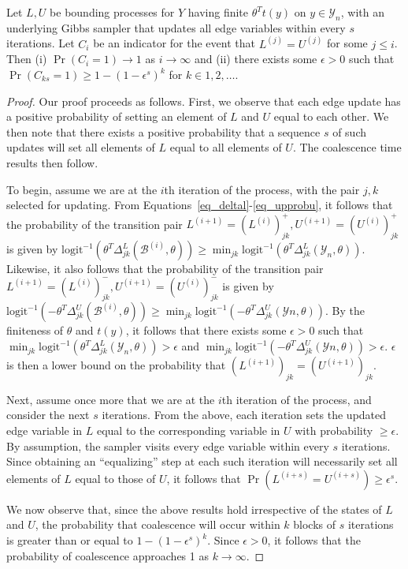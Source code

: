 \documentclass[11pt]{article}
\newcommand{\ilogit}{\ensuremath{\mathrm{logit}^{-1}}\xspace}
\begin{document}
\begin{theorem} \label{thm_coal}
Let $L, U$ be bounding processes for $Y$ having finite $\theta^T t(y)$ on $y\in \mathcal{Y}_n$, with an underlying Gibbs sampler that updates all edge variables within every $s$ iterations.  Let $C_i$ be an indicator for the event that $L^{(j)}=U^{(j)}$ for some $j\le i$.  Then (i) $\Pr(C_i=1)\to 1$ as $i \to \infty$ and (ii) there exists some $\epsilon>0$ such that $\Pr(C_{ks}=1)\ge 1-(1-\epsilon^s)^k$ for $k\in 1,2,\ldots$.
\end{theorem}
\begin{proof}
Our proof proceeds as follows.  First, we observe that each edge update has a positive probability of setting an element of $L$ and $U$ equal to each other.  We then note that there exists a positive probability that a sequence $s$ of such updates will set all elements of $L$ equal to all elements of $U$.  The coalescence time results then follow.

To begin, assume we are at the $i$th iteration of the process, with the pair $j,k$ selected for updating.  From Equations~\ref{eq_deltal}-\ref{eq_upprobu}, it follows that the probability of the transition pair $L^{(i+1)}=\left(L^{(i)}\right)^+_{jk}, U^{(i+1)}=\left(U^{(i)}\right)^+_{jk}$ is given by $\ilogit\left(\theta^T \Delta^L_{jk}\left(\mathcal{B}^{(i)},\theta\right) \right) \ge \min_{jk} \ilogit\left(\theta^T \Delta^L_{jk}\left(\mathcal{Y}_n,\theta\right) \right)$.  Likewise, it also follows that the probability of the transition pair $L^{(i+1)}=\left(L^{(i)}\right)^-_{jk}, U^{(i+1)}=\left(U^{(i)}\right)^-_{jk}$ is given by $\ilogit\left(-\theta^T \Delta^U_{jk}\left(\mathcal{B}^{(i)},\theta\right) \right) \ge \min_{jk} \ilogit\left(-\theta^T \Delta^U_{jk}\left(\mathcal{Y}n,\theta\right) \right)$.  By the finiteness of $\theta$ and $t(y)$, it follows that there exists some $\epsilon>0$ such that $\min_{jk} \ilogit\left(\theta^T \Delta^L_{jk}\left(\mathcal{Y}_n,\theta\right) \right) > \epsilon$ and $\min_{jk} \ilogit\left(-\theta^T \Delta^U_{jk}\left(\mathcal{Y}n,\theta\right) \right) > \epsilon$.  $\epsilon$ is then a lower bound on the probability that $\left(L^{(i+1)}\right)_{jk}=\left(U^{(i+1)}\right)_{jk}$.

Next, assume once more that we are at the $i$th iteration of the process, and consider the next $s$ iterations.  From the above, each iteration sets the updated edge variable in $L$ equal to the corresponding variable in $U$ with probability $\ge \epsilon$.  By assumption, the sampler visits every edge variable within every $s$ iterations. Since obtaining an ``equalizing'' step at each such iteration will necessarily set all elements of $L$ equal to those of $U$, it follows that $\Pr(L^{(i+s)}=U^{(i+s)})\ge \epsilon^s$.

We now observe that, since the above results hold irrespective of the states of $L$ and $U$, the probability that coalescence will occur within $k$ blocks of $s$ iterations is greater than or equal to $1-(1-\epsilon^s)^k$.  Since $\epsilon>0$, it follows that the probability of coalescence approaches 1 as $k\to \infty$. 
\end{proof}
\end{document}
